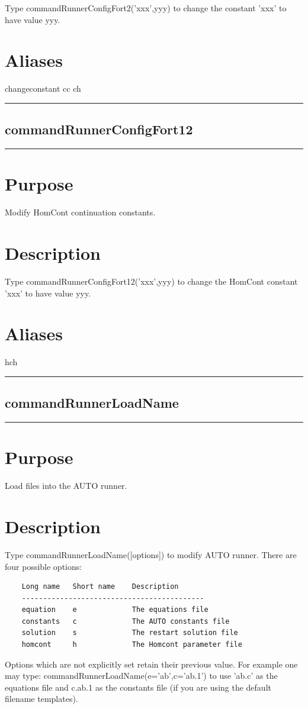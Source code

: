 \documentclass[12pt]{report}
\begin{document}
\begin{minipage}{6in}
    Type commandRunnerConfigFort2('xxx',yyy) to change the constant 'xxx' to have
    value yyy.
    \section*{Aliases}
changeconstant cc ch \medskip\hrule\end{minipage}\subsection{commandRunnerConfigFort12} \label{sec:clui_ref_commandRunnerConfigFort12}\begin{minipage}{6in}\hrule\medskip\section*{Purpose}
Modify HomCont continuation constants.\section*{Description}

    Type commandRunnerConfigFort12('xxx',yyy) to change the HomCont constant 'xxx' to have
    value yyy.
    \section*{Aliases}
hch \medskip\hrule\end{minipage}\subsection{commandRunnerLoadName} \label{sec:clui_ref_commandRunnerLoadName}\begin{minipage}{6in}\hrule\medskip\section*{Purpose}
Load files into the AUTO runner.\section*{Description}

    Type commandRunnerLoadName([options]) to modify AUTO runner.
    There are four possible options:
    \begin{verbatim}
    Long name   Short name    Description
    -------------------------------------------
    equation    e             The equations file
    constants   c             The AUTO constants file
    solution    s             The restart solution file
    homcont     h             The Homcont parameter file
    \end{verbatim}
    Options which are not explicitly set retain their previous value.
    For example one may type: commandRunnerLoadName(e='ab',c='ab.1') to use 'ab.c' as
    the equations file and c.ab.1 as the constants file (if you are
    using the default filename templates).


\end{minipage}
\end{document}
